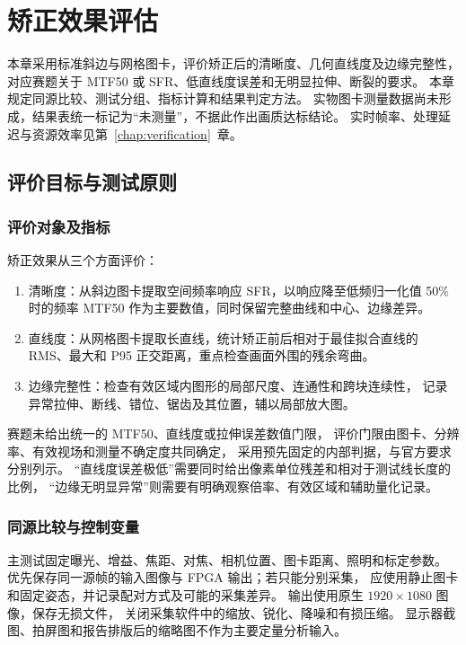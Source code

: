 \chapter{矫正效果评估}
\label{chap:performance}
\newcommand{\qualitypending}{未测量}

本章采用标准斜边与网格图卡，评价矫正后的清晰度、几何直线度及边缘完整性，
对应赛题关于 MTF50 或 SFR、低直线度误差和无明显拉伸、断裂的要求。
本章规定同源比较、测试分组、指标计算和结果判定方法。
实物图卡测量数据尚未形成，结果表统一标记为“未测量”，不据此作出画质达标结论。
实时帧率、处理延迟与资源效率见第~\ref{chap:verification}~章。

\section{评价目标与测试原则}
\subsection{评价对象及指标}
矫正效果从三个方面评价：
\begin{enumerate}
\item 清晰度：从斜边图卡提取空间频率响应 SFR，以响应降至低频归一化值
50\% 时的频率 MTF50 作为主要数值，同时保留完整曲线和中心、边缘差异。
\item 直线度：从网格图卡提取长直线，统计矫正前后相对于最佳拟合直线的
RMS、最大和 P95 正交距离，重点检查画面外围的残余弯曲。
\item 边缘完整性：检查有效区域内图形的局部尺度、连通性和跨块连续性，
记录异常拉伸、断线、错位、锯齿及其位置，辅以局部放大图。
\end{enumerate}

赛题未给出统一的 MTF50、直线度或拉伸误差数值门限，
评价门限由图卡、分辨率、有效视场和测量不确定度共同确定，
采用预先固定的内部判据，与官方要求分别列示。
“直线度误差极低”需要同时给出像素单位残差和相对于测试线长度的比例，
“边缘无明显异常”则需要有明确观察倍率、有效区域和辅助量化记录。

\subsection{同源比较与控制变量}
主测试固定曝光、增益、焦距、对焦、相机位置、图卡距离、照明和标定参数。
优先保存同一源帧的输入图像与 FPGA 输出；若只能分别采集，
应使用静止图卡和固定姿态，并记录配对方式及可能的采集差异。
输出使用原生 $1920\times1080$ 图像，保存无损文件，
关闭采集软件中的缩放、锐化、降噪和有损压缩。
显示器截图、拍屏图和报告排版后的缩略图不作为主要定量分析输入。

